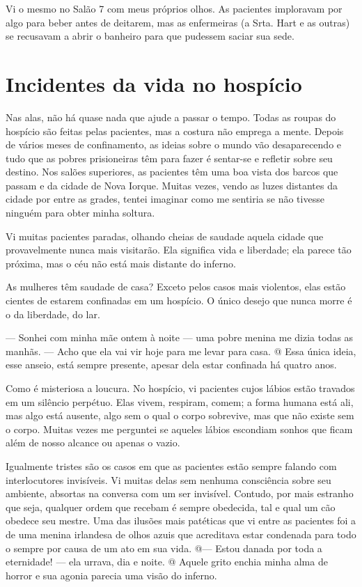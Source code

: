 Vi o mesmo no Salão 7 com meus próprios olhos. As pacientes imploravam
por algo para beber antes de deitarem, mas as enfermeiras (a Srta. Hart
e as outras) se recusavam a abrir o banheiro para que pudessem saciar
sua sede.

\label{section-9}

\chapter{Incidentes da vida no
hospício}\label{capuxedtulo-xv-incidentes-da-vida-no-hospuxedcio}

Nas alas, não há quase nada que ajude a passar o tempo. Todas as roupas
do hospício são feitas pelas pacientes, mas a costura não emprega a
mente. Depois de vários meses de confinamento, as ideias sobre o mundo
vão desaparecendo e tudo que as pobres prisioneiras têm para fazer é
sentar-se e refletir sobre seu destino. Nos salões superiores, as
pacientes têm uma boa vista dos barcos que passam e da cidade de Nova
Iorque. Muitas vezes, vendo as luzes distantes da cidade por entre as
grades, tentei imaginar como me sentiria se não tivesse ninguém para
obter minha soltura.

Vi muitas pacientes paradas, olhando cheias de saudade aquela cidade que
provavelmente nunca mais visitarão. Ela significa vida e liberdade; ela
parece tão próxima, mas o céu não está mais distante do inferno.

As mulheres têm saudade de casa? Exceto pelos casos mais violentos, elas
estão cientes de estarem confinadas em um hospício. O único desejo que
nunca morre é o da liberdade, do lar.

--- Sonhei com minha mãe ontem à noite --- uma pobre menina me dizia
todas as manhãs. --- Acho que ela vai vir hoje para me levar para casa.
@ Essa única ideia, esse anseio, está sempre presente, apesar dela estar
confinada há quatro anos.

Como é misteriosa a loucura. No hospício, vi pacientes cujos lábios
estão travados em um silêncio perpétuo. Elas vivem, respiram, comem; a
forma humana está ali, mas algo está ausente, algo sem o qual o corpo
sobrevive, mas que não existe sem o corpo. Muitas vezes me perguntei se
aqueles lábios escondiam sonhos que ficam além de nosso alcance ou
apenas o vazio.

Igualmente tristes são os casos em que as pacientes estão sempre falando
com interlocutores invisíveis. Vi muitas delas sem nenhuma consciência
sobre seu ambiente, absortas na conversa com um ser invisível. Contudo,
por mais estranho que seja, qualquer ordem que recebam é sempre
obedecida, tal e qual um cão obedece seu mestre. Uma das ilusões mais
patéticas que vi entre as pacientes foi a de uma menina irlandesa de
olhos azuis que acreditava estar condenada para todo o sempre por causa
de um ato em sua vida. @--- Estou danada por toda a eternidade! --- ela
urrava, dia e noite. @ Aquele grito enchia minha alma de horror e sua
agonia parecia uma visão do inferno.


